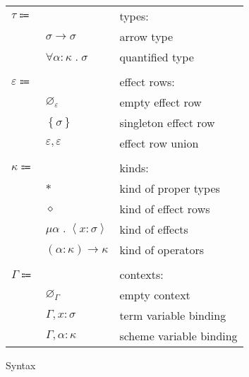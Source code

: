 \documentclass[12pt]{article}
\newcommand\anno[2]{#1 : #2} %
\newcommand\parens[1]{\left( #1 \right)} %
\newcommand\evar{x}
\newcommand\scheme{\sigma}
\newcommand\svar{\alpha}
\newcommand\type{\tau}
\newcommand\tarrow[2]{#1 \rightarrow #2} %
\newcommand\tforall[2]{\forall #1 \; . \; #2} %
\newcommand\row{\varepsilon}
\newcommand\rempty{\varnothing_{\row}}
\newcommand\rsingleton[1]{\left\{ #1 \right\}}
\newcommand\runion[2]{#1, #2}
\newcommand\kind{\kappa}
\newcommand\ktype{\ast}
\newcommand\krow{\diamond} %
\newcommand\keffect[3]{\mu #1 \; . \; \left\langle\anno{#2}{#3}\right\rangle} %
\newcommand\karrow[2]{\parens{#1} \rightarrow #2} %
\newcommand\context{\Gamma}
\newcommand\cempty{\varnothing_{\context}}
\newcommand\ceextend[2]{#1, #2}
\newcommand\csextend[2]{#1, #2}
\begin{document}
\begin{figure}
\begin{mdframed}[backgroundcolor=none]
\begin{center}
\begin{tabular}{l l l}
          $\type \Coloneqq$ & & types: \\
          & $\tarrow{\scheme}{\scheme}$ & arrow type \\
          & $\tforall{\anno{\svar}{\kind}}{\scheme}$ & quantified type \\
          \\
          $\row \Coloneqq$ & & effect rows: \\
          & $\rempty$ & empty effect row \\
          & $\rsingleton{\scheme}$ & singleton effect row \\
          & $\runion{\row}{\row}$ & effect row union \\
          \\
          $\kind \Coloneqq $ & & kinds: \\
          & $\ktype$ & kind of proper types \\
          & $\krow$ & kind of effect rows \\
          & $\keffect{\svar}{\evar}{\scheme}$ & kind of effects \\
          & $\karrow{\anno{\svar}{\kind}}{\kind}$ & kind of operators \\
          \\
          $\context \Coloneqq$ & & contexts: \\
          & $\cempty$ & empty context \\
          & $\ceextend{\context}{\anno{\evar}{\scheme}}$ & term variable binding \\
          & $\csextend{\context}{\anno{\svar}{\kind}}$ & scheme variable binding \\
        \end{tabular}
      \end{center}

      \caption{Syntax}\label{fig:syntax}
    \end{mdframed}
  \end{figure}
\end{document}
